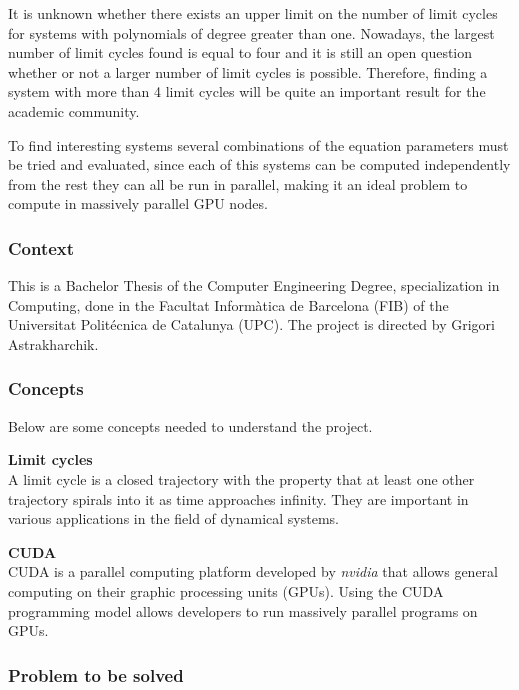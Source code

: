 \pagebreak
It is unknown whether there exists an upper limit on the number of limit cycles
for systems with polynomials of degree greater than
one\cite{ilyashenko_centennial_2002,llibre_16hilbert_nodate}.  Nowadays, the
largest number of limit cycles found is equal to four and it is still an open
question whether or not a larger number of limit cycles is possible. Therefore,
finding a system with more than 4 limit cycles will be quite an important result
for the academic community.

To find interesting systems several combinations of the equation parameters
must be tried and evaluated, since each of this systems can be computed
independently from the rest they can all be run in parallel, making it an ideal
problem to compute in massively parallel GPU nodes.

\subsubsection{Context}

This is a Bachelor Thesis of the Computer Engineering Degree, specialization in
Computing, done in the \textcatalan{Facultat Inform\`atica de Barcelona (FIB)}
of the \textcatalan{Universitat Polit\'ecnica de Catalunya (UPC)}. The project
is directed by Grigori Astrakharchik.

\subsubsection{Concepts}

Below are some concepts needed to understand the project.

\newcommand{\concept}[1]{\textbf{#1}\\}

\concept{Limit cycles}
A limit cycle is a closed trajectory with the property that at least one other
trajectory spirals into it as time approaches infinity. They are important in
various applications in the field of dynamical systems.

\concept{CUDA}
CUDA is a parallel computing platform developed by \emph{nvidia} that allows general
computing on their graphic processing units (GPUs). Using the CUDA programming
model allows developers to run massively parallel programs on GPUs.

\pagebreak
\subsubsection{Problem to be solved}

